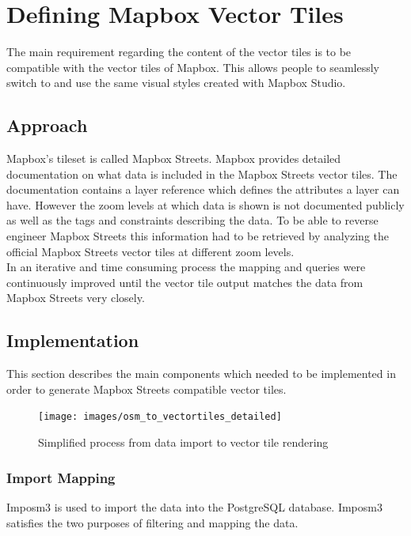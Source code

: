 \chapter{Defining Mapbox Vector Tiles}\label{chapter_defining_mapbox_vector_tiles}

The main requirement regarding the content of the vector tiles is to be compatible with the vector tiles of Mapbox. This allows people to seamlessly switch to \osmvt{} and use the same visual styles created with Mapbox Studio. 

\section{Approach}
Mapbox's tileset is called Mapbox Streets. Mapbox provides detailed documentation on what data is included in the Mapbox Streets vector tiles. The documentation contains a layer reference which defines the attributes a layer can have. However the zoom levels at which data is shown is not documented publicly as well as the \osm{} tags and constraints describing the data. To be able to reverse engineer Mapbox Streets this information had to be retrieved by analyzing the official Mapbox Streets vector tiles at different zoom levels.\\
In an iterative and time consuming process the mapping and queries were continuously improved until the vector tile output matches the data from Mapbox Streets very closely.

\section{Implementation}
This section describes the main components which needed to be implemented in order to generate Mapbox Streets compatible vector tiles.

\begin{figure}[H]
\centering
\texttt{[image: images/osm\_to\_vectortiles\_detailed]}
\caption{Simplified process from data import to vector tile rendering}
\end{figure}

\clearpage

\subsection{Import Mapping}\label{sub_import_mapping}

Imposm3\cite{4_github_2015} is used to import the \osm{} data into the PostgreSQL database. Imposm3 satisfies the two purposes of filtering and mapping the \osm{} data.

